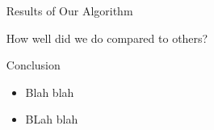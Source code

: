 \documentclass[final,t]{beamer}
\makeatletter
\DeclareRobustCommand\onedot{\futurelet\@let@token\@onedot}
\def\@onedot{\ifx\@let@token.\else.\null\fi\xspace}
\def\eg{{e.g}\onedot} \def\Eg{{E.g}\onedot}
\makeatother
\begin{document}
\begin{frame}{}
\begin{columns}[t]
\begin{column}{.305\linewidth}



    \end{column}

    
    \begin{column}{.305\linewidth}

      \begin{block}{Results of Our Algorithm}
        
        How well did we do compared to others?
      \end{block}
      
  
        
                
      \begin{block}{Conclusion}
        \begin{itemize}
        \item Blah blah
        \item BLah blah
        \end{itemize}
        \vspace{-1ex}
      \end{block}

    \end{column}
  \end{columns}
\end{frame}
\end{document}

